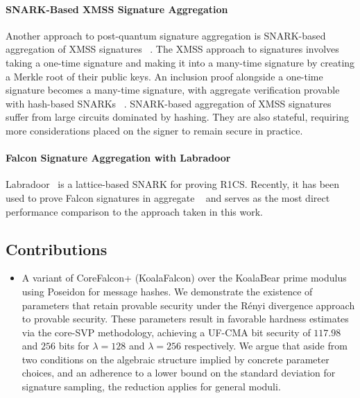 \paragraph{SNARK-Based XMSS Signature Aggregation}

Another approach to post-quantum signature aggregation is SNARK-based aggregation of XMSS 
signatures ~\cite{cryptoeprint:2011/484}. The XMSS approach to signatures involves taking a 
one-time signature and making it into a many-time signature by creating a Merkle root of 
their public keys. An inclusion proof alongside a one-time signature 
becomes a many-time signature, with aggregate verification provable with hash-based SNARKs 
~\cite{10.62056/aey7qjp10}. SNARK-based aggregation of XMSS signatures suffer from large circuits 
dominated by hashing. They are also stateful, requiring more considerations placed on the signer 
to remain secure in practice. 

\paragraph{Falcon Signature Aggregation with Labradoor}

Labradoor~\cite{cryptoeprint:2022/1341} is a lattice-based SNARK for proving R1CS. 
Recently, it has been used to prove Falcon signatures in aggregate 
~\cite{cryptoeprint:2024/311} and serves as the most direct performance comparison to the 
approach taken in this work.

\subsection{Contributions}

\begin{itemize}
  \item A variant of CoreFalcon+ (KoalaFalcon) over the KoalaBear 
  prime modulus using Poseidon for message hashes. We demonstrate the existence 
  of parameters that retain provable security under the Rényi 
  divergence approach to provable security. These parameters result 
  in favorable hardness estimates via the core-SVP methodology, achieving a UF-CMA bit security of $117.98$ and 
  $256$ bits for $\lambda = 128$ and $\lambda = 256$ respectively.
  We argue that aside from two conditions on the algebraic structure implied 
  by concrete parameter choices, and an adherence to a lower bound on the 
  standard deviation for signature sampling, the reduction applies for 
  general moduli.

\end{itemize}
